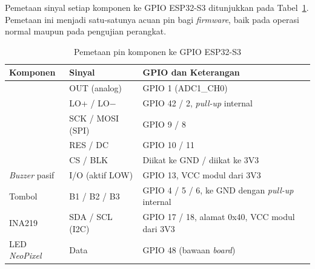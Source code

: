 Pemetaan sinyal setiap komponen ke GPIO ESP32-S3 ditunjukkan pada Tabel~\ref{tab:pin-map}. Pemetaan ini menjadi satu-satunya acuan pin bagi \textit{firmware}, baik pada operasi normal maupun pada pengujian perangkat.

\begin{table}[!ht]
  \centering
  \caption{Pemetaan pin komponen ke GPIO ESP32-S3}
  \label{tab:pin-map}
  \small
  \setlength{\tabcolsep}{4pt}
  \renewcommand{\arraystretch}{1.15}
  \begin{tabularx}{\linewidth}{>{\RaggedRight\arraybackslash}p{3.0cm}>{\RaggedRight\arraybackslash}p{3.4cm}>{\RaggedRight\arraybackslash}X}
    \toprule
    \textbf{Komponen} & \textbf{Sinyal} & \textbf{GPIO dan Keterangan} \\
    \midrule
    \multirow{2}{*}{AD8232} & OUT (analog) & GPIO 1 (ADC1\_CH0) \\
    & LO+ / LO$-$ & GPIO 42 / 2, \textit{pull-up} internal \\
    \midrule
    \multirow{3}{*}{TFT ST7789} & SCK / MOSI (SPI) & GPIO 9 / 8 \\
    & RES / DC & GPIO 10 / 11 \\
    & CS / BLK & Diikat ke GND / diikat ke 3V3 \\
    \midrule
    \textit{Buzzer} pasif & I/O (aktif LOW) & GPIO 13, VCC modul dari 3V3 \\
    \midrule
    Tombol & B1 / B2 / B3 & GPIO 4 / 5 / 6, ke GND dengan \textit{pull-up} internal \\
    \midrule
    INA219 & SDA / SCL (I2C) & GPIO 17 / 18, alamat 0x40, VCC modul dari 3V3 \\
    \midrule
    LED \textit{NeoPixel} & Data & GPIO 48 (bawaan \textit{board}) \\
    \bottomrule
  \end{tabularx}
\end{table}

